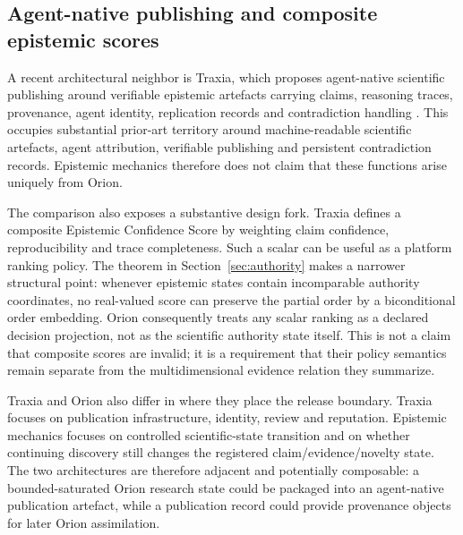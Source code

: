 \subsection{Agent-native publishing and composite epistemic scores}

A recent architectural neighbor is Traxia, which proposes agent-native scientific publishing around verifiable epistemic artefacts carrying claims, reasoning traces, provenance, agent identity, replication records and contradiction handling \cite{dogah2026traxia}. This occupies substantial prior-art territory around machine-readable scientific artefacts, agent attribution, verifiable publishing and persistent contradiction records. Epistemic mechanics therefore does not claim that these functions arise uniquely from Orion.

The comparison also exposes a substantive design fork. Traxia defines a composite Epistemic Confidence Score by weighting claim confidence, reproducibility and trace completeness. Such a scalar can be useful as a platform ranking policy. The theorem in Section~\ref{sec:authority} makes a narrower structural point: whenever epistemic states contain incomparable authority coordinates, no real-valued score can preserve the partial order by a biconditional order embedding. Orion consequently treats any scalar ranking as a declared decision projection, not as the scientific authority state itself. This is not a claim that composite scores are invalid; it is a requirement that their policy semantics remain separate from the multidimensional evidence relation they summarize.

Traxia and Orion also differ in where they place the release boundary. Traxia focuses on publication infrastructure, identity, review and reputation. Epistemic mechanics focuses on controlled scientific-state transition and on whether continuing discovery still changes the registered claim/evidence/novelty state. The two architectures are therefore adjacent and potentially composable: a bounded-saturated Orion research state could be packaged into an agent-native publication artefact, while a publication record could provide provenance objects for later Orion assimilation.
